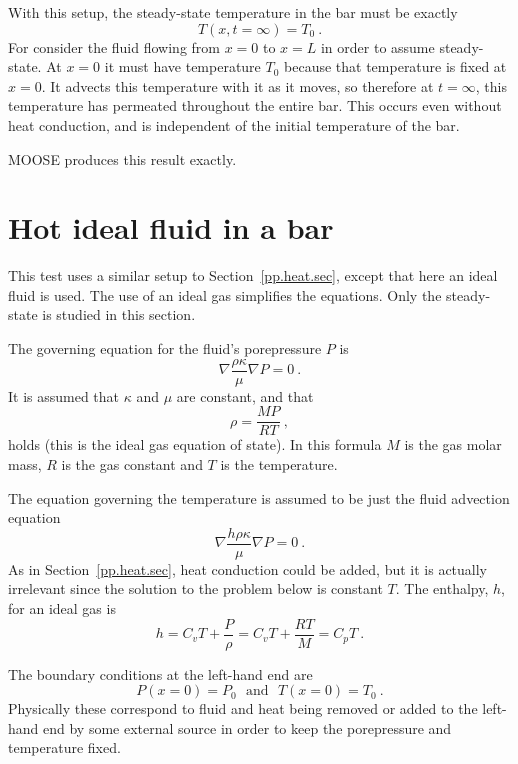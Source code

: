 With this setup, the steady-state temperature in the bar must be
exactly
\begin{equation}
T(x, t=\infty) = T_{0} \ .
\end{equation}
For consider the fluid flowing from $x=0$ to $x=L$ in order to assume
steady-state.  At $x=0$ it must have temperature $T_{0}$ because that
temperature is fixed at $x=0$.  It advects this temperature with it as
it moves, so therefore at $t=\infty$, this temperature has permeated
throughout the entire bar.  This occurs even without heat conduction,
and is independent of the initial temperature of the bar.

MOOSE produces this result exactly.


\chapter{Hot ideal fluid in a bar}

This test uses a similar setup to Section~\ref{pp.heat.sec}, except
that here an ideal fluid is used.  The use of an ideal gas simplifies
the equations.  Only the steady-state is studied in this section.

The governing equation for the fluid's porepressure $P$ is
\begin{equation}
\nabla \frac{\rho\kappa}{\mu}\nabla P = 0 \ .
\end{equation}
It is assumed that $\kappa$ and $\mu$ are constant, and that
\begin{equation}
\rho = \frac{MP}{RT} \ ,
\end{equation}
holds (this is the ideal gas equation of state).  In this formula $M$
is the gas molar mass, $R$ is the gas constant and $T$ is the
temperature.

The equation governing the temperature is assumed to be just the fluid
advection equation
\begin{equation}
\nabla\frac{h\rho\kappa}{\mu}\nabla P = 0 \ .
\end{equation}
As in Section~\ref{pp.heat.sec}, heat conduction could be added, but
it is actually irrelevant since the solution to the problem below is
constant $T$.  The enthalpy, $h$, for an ideal gas is
\begin{equation}
h = C_{v}T + \frac{P}{\rho} = C_{v}T + \frac{RT}{M} = C_{p}T \ .
\end{equation}

The boundary conditions at the left-hand end are
\begin{equation}
P(x=0) = P_{0} \ \ \ \mbox{and}\ \ \ T(x=0)=T_{0} \ .
\end{equation}
Physically these correspond to fluid and heat being removed or added
to the left-hand end by some external source in order to keep the
porepressure and temperature fixed.

